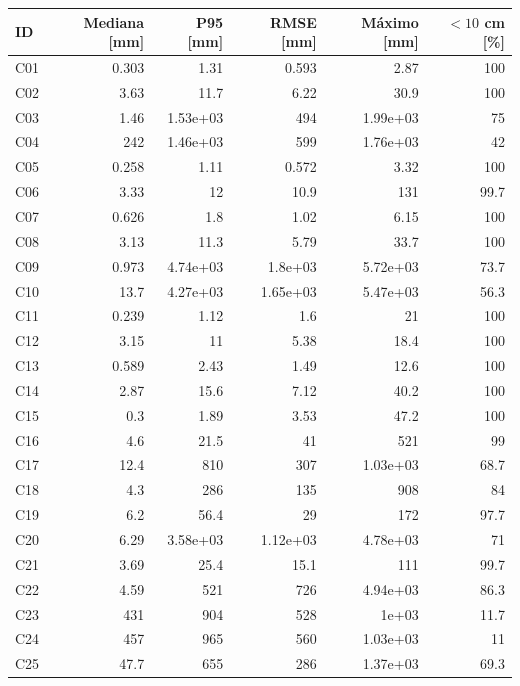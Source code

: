 \begin{longtable}{lrrrrr}\toprule
ID & Mediana [mm] & P95 [mm] & RMSE [mm] & Máximo [mm] & $<10$ cm [\%]\\\midrule\endhead
C01 & 0.303 & 1.31 & 0.593 & 2.87 & 100 \\
C02 & 3.63 & 11.7 & 6.22 & 30.9 & 100 \\
C03 & 1.46 & 1.53e+03 & 494 & 1.99e+03 & 75 \\
C04 & 242 & 1.46e+03 & 599 & 1.76e+03 & 42 \\
C05 & 0.258 & 1.11 & 0.572 & 3.32 & 100 \\
C06 & 3.33 & 12 & 10.9 & 131 & 99.7 \\
C07 & 0.626 & 1.8 & 1.02 & 6.15 & 100 \\
C08 & 3.13 & 11.3 & 5.79 & 33.7 & 100 \\
C09 & 0.973 & 4.74e+03 & 1.8e+03 & 5.72e+03 & 73.7 \\
C10 & 13.7 & 4.27e+03 & 1.65e+03 & 5.47e+03 & 56.3 \\
C11 & 0.239 & 1.12 & 1.6 & 21 & 100 \\
C12 & 3.15 & 11 & 5.38 & 18.4 & 100 \\
C13 & 0.589 & 2.43 & 1.49 & 12.6 & 100 \\
C14 & 2.87 & 15.6 & 7.12 & 40.2 & 100 \\
C15 & 0.3 & 1.89 & 3.53 & 47.2 & 100 \\
C16 & 4.6 & 21.5 & 41 & 521 & 99 \\
C17 & 12.4 & 810 & 307 & 1.03e+03 & 68.7 \\
C18 & 4.3 & 286 & 135 & 908 & 84 \\
C19 & 6.2 & 56.4 & 29 & 172 & 97.7 \\
C20 & 6.29 & 3.58e+03 & 1.12e+03 & 4.78e+03 & 71 \\
C21 & 3.69 & 25.4 & 15.1 & 111 & 99.7 \\
C22 & 4.59 & 521 & 726 & 4.94e+03 & 86.3 \\
C23 & 431 & 904 & 528 & 1e+03 & 11.7 \\
C24 & 457 & 965 & 560 & 1.03e+03 & 11 \\
C25 & 47.7 & 655 & 286 & 1.37e+03 & 69.3 \\
\bottomrule\end{longtable}
